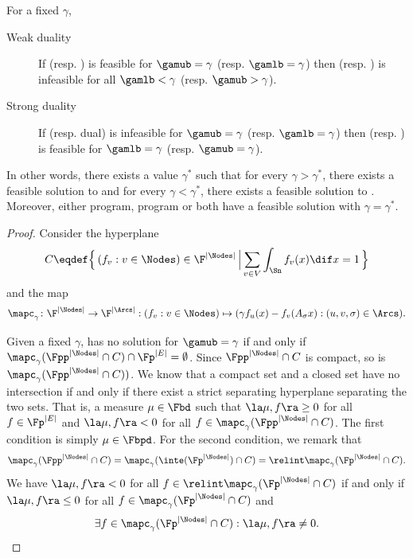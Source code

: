 \begin{lemma}
  \label{lem:duality}
  For a fixed $\gamma$,
  \begin{description}
    \item[Weak duality] If  (resp. ) is feasible for $\gamub = \gamma$ (resp. $\gamlb = \gamma$) then  (resp. ) is infeasible for all $\gamlb < \gamma$ (resp. $\gamub > \gamma$).
    \item[Strong duality] If  (resp. dual) is infeasible for $\gamub = \gamma$ (resp. $\gamlb = \gamma$) then  (resp. ) is feasible for $\gamlb = \gamma$ (resp. $\gamub = \gamma$).
  \end{description}

  In other words, there exists a value $\gamma^*$ such that
  for every $\gamma > \gamma^*$, there exists a feasible solution to   and
  for every $\gamma < \gamma^*$, there exists a feasible solution to  .
  Moreover, either  program,  program or both have a feasible solution with $\gamma = \gamma^*$.
  \begin{proof}
    Consider the hyperplane
    \[ C \eqdef \Big\{\, (f_v : v \in \Nodes) \in \F^{|\Nodes|} \, \Big| \sum_{v \in V} \int_{\Sn} f_v(x) \dif x = 1 \,\Big\} \]
    and the map
    \[ \mapc_\gamma \colon \F^{|\Nodes|} \to \F^{|\Arcs|} : (f_v : v \in \Nodes) \mapsto (\gamma f_u(x) - f_v(A_\sigma x) : (u,v,\sigma) \in \Arcs). \]

    Given a fixed $\gamma$,
     has no solution for $\gamub = \gamma$
    if and only if $\mapc_{\gamma}(\Fpp^{|\Nodes|} \cap C) \cap \Fp^{|E|} = \emptyset$.
    Since $\Fpp^{|\Nodes|} \cap C$ is compact, so is $\mapc_{\gamma}(\Fpp^{|\Nodes|} \cap C))$.
    We know that a compact set and a closed set have no intersection if and only if there exist a strict separating hyperplane separating the two sets.
    That is, a measure $\mu \in \Fbd$ such that $\la \mu, f \ra \geq 0$ for all $f \in \Fp^{|E|}$ and $\la \mu, f \ra < 0$ for all $f \in \mapc_{\gamma}(\Fpp^{|\Nodes|} \cap C)$.
    The first condition is simply $\mu \in \Fbpd$.
    For the second condition, we remark that
    \[ \mapc_{\gamma}(\Fpp^{|\Nodes|} \cap C) = \mapc_{\gamma}(\inte(\Fp^{|\Nodes|}) \cap C) = \relint\mapc_{\gamma}(\Fp^{|\Nodes|} \cap C). \]
    We have $\la \mu, f \ra < 0$ for all $f \in \relint\mapc_{\gamma}(\Fp^{|\Nodes|} \cap C)$ if and only if
    $\la \mu, f \ra \leq 0$ for all $f \in \mapc_{\gamma}(\Fp^{|\Nodes|} \cap C)$ and
    \begin{equation}
      \label{eq:affinhyp}
      \exists f \in \mapc_{\gamma}(\Fp^{|\Nodes|} \cap C) : \la \mu, f \ra \neq 0.
    \end{equation}


\end{proof}
\end{lemma}

